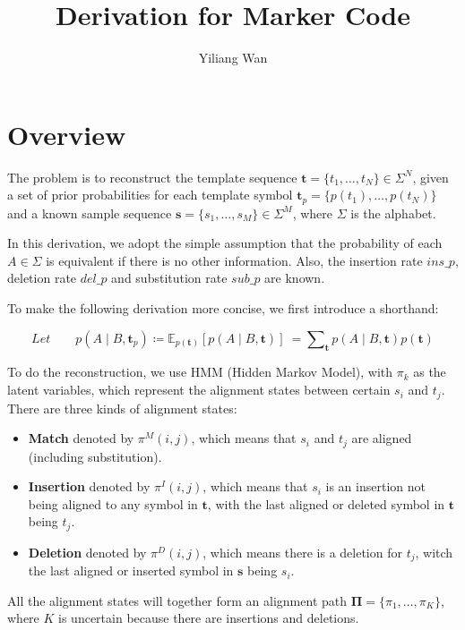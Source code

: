 \documentclass[10pt]{article}
\title{Derivation for Marker Code}
\author{Yiliang Wan}
\date{}
\begin{document}
\maketitle


\section{Overview}

  The problem is to reconstruct the template sequence  $\mathbf{t} = \{t_1, \dots, t_N\} \in \Sigma^{N}$, given a set of prior probabilities for each template symbol $\mathbf{t}_p = \{p(t_1), \dots, p(t_N)\}$ and a known sample sequence  $\mathbf{s} = \{s_1, \dots, s_M\} \in \Sigma^{M}$, where $\Sigma$ is the alphabet.

  In this derivation, we adopt the simple assumption that the probability of each $A \in \Sigma$ is equivalent if there is no other information. Also, the insertion rate $ins\_p$, deletion rate $del\_p$ and substitution rate $sub\_p$ are known.

  To make the following derivation more concise, we first introduce a shorthand:

  \begin{equation*}
    Let \qquad p(A \;|\; B, \mathbf{t}_p) \coloneqq \mathbb{E}_{p(\mathbf{t})} \left[ p(A \;|\; B, \mathbf{t}) \right] \
      = \sum\nolimits_{\mathbf{t}} p(A \;|\; B, \mathbf{t}) p(\mathbf{t})
  \end{equation*}

  To do the reconstruction, we use HMM (Hidden Markov Model), with $\pi_k$ as the latent variables, which represent the alignment states between certain $s_i$ and $t_j$. There are three kinds of alignment states:

  \begin{itemize}
    \item \textbf{Match} denoted by $\pi^{M}(i, j)$, which means that $s_i$ and $t_j$ are aligned (including substitution).
    \item \textbf{Insertion} denoted by $\pi^{I}(i, j)$, which means that $s_i$ is an insertion not being aligned to any symbol in $\mathbf{t}$, with the last aligned or deleted symbol in $\mathbf{t}$ being $t_j$.
    \item \textbf{Deletion} denoted by $\pi^{D}(i, j)$, which means there is a deletion for $t_j$, witch the last aligned or inserted symbol in $\mathbf{s}$ being $s_i$.
  \end{itemize}

  All the alignment states will together form an alignment path $\mathbf{\Pi} = \{ \pi_1, \dots, \pi_K\}$, where $K$ is uncertain because there are insertions and deletions.
\end{document}
